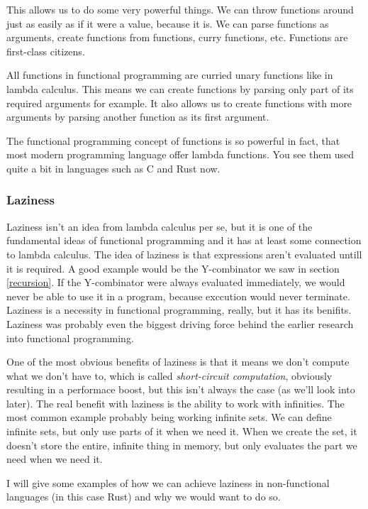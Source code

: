 \documentclass[11pt]{article}
\begin{document}
This allows us to do some very powerful things. We can throw functions around
just as easily as if it were a value, because it is. We can parse functions as
arguments, create functions from functions, curry functions, etc. Functions are
first-class citizens.

All functions in functional programming are curried unary functions like in
lambda calculus. This means we can create functions by parsing only part of its
required arguments for example. It also allows us to create functions with more
arguments by parsing another function as its first argument.

The functional programming concept of functions is so powerful in fact, that
most modern programming language offer lambda functions. You see them used
quite a bit in languages such as C and Rust now.

\subsubsection{Laziness}\label{laziness}

Laziness isn't an idea from lambda calculus per se, but it is one of the
fundamental ideas of functional programming and it has at least some connection
to lambda calculus. The idea of laziness is that expressions aren't evaluated
untill it is required. A good example would be the Y-combinator we saw in
section \ref{recursion}. If the Y-combinator were always evaluated immediately,
we would never be able to use it in a program, because exccution would never
terminate. Laziness is a necessity in functional programming, really, but it
has its benifits. Laziness was probably even the biggest driving force behind
the earlier research into functional programming.

One of the most obvious benefits of laziness is that it means we don't compute
what we don't have to, which is called \emph{short-circuit computation},
obviously resulting in a performace boost, but this isn't always the case (as
we'll look into later). The real benefit with laziness is the ability to work
with infinities. The most common example probably being working infinite sets.
We can define infinite sets, but only use parts of it when we need it.  When we
create the set, it doesn't store the entire, infinite thing in memory, but only
evaluates the part we need when we need it.

I will give some examples of how we can achieve laziness in non-functional
languages (in this case Rust) and why we would want to do so.
\end{document}
